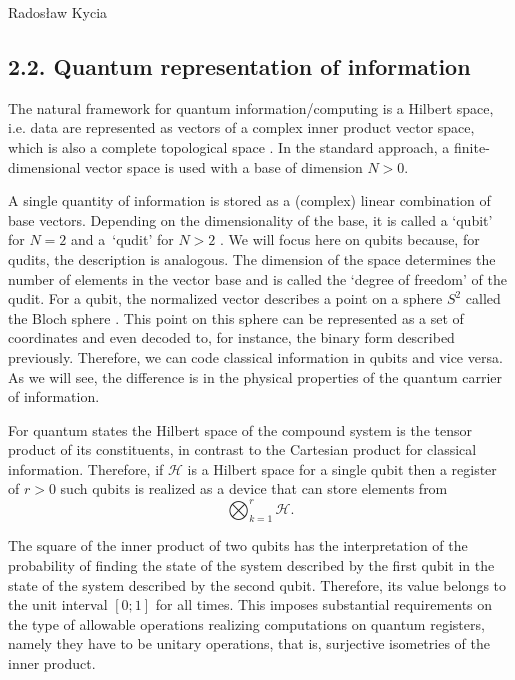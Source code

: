 \begin{artengenv}{Radosław Kycia}
\subsection{2.2. Quantum representation of information}

The natural framework for quantum information/computing is a Hilbert space, i.e. data are represented as vectors of a complex inner product vector space, which is also a complete topological space \parencite{FunctionalAnalysisReed}. In the standard approach, a finite-dimensional vector space is used with a base of dimension $N >0$.

A single quantity of information is stored as a (complex) linear combination of base vectors. Depending on the dimensionality of the base, it is called a `qubit' for $N=2$ and a~`qudit' for $N>2$ \parencite[see e.g.][]{QuantumComputing}. We will focus here on qubits because, for qudits, the description is analogous. The dimension of the space determines the number of elements in the vector base and is called the `degree of freedom' of the qudit. For a qubit, the normalized vector describes a point on a sphere $S^{2}$ called the Bloch sphere \parencite{QuantumComputing}. This point on this sphere can be represented as a set of coordinates and even decoded to, for instance, the binary form described previously. Therefore, we can code classical information in qubits and vice versa. As we will see, the difference is in the physical properties of the quantum carrier of information. 

For quantum states the Hilbert space of the compound system is the tensor product of its constituents, in contrast to the Cartesian product for classical information. Therefore, if $\mathcal{H}$ is a Hilbert space for a single qubit then a register of $r>0$ such qubits is realized as a device that can store elements from
\begin{equation}
 \bigotimes_{k=1}^{r} \mathcal{H}.
\end{equation}

The square of the inner product of two qubits has the interpretation of the probability of finding the state of the system described by the first qubit in the state of the system described by the second qubit. Therefore, its value belongs to the unit interval $[0; 1]$ for all times. This imposes substantial requirements on the type of allowable operations realizing computations on quantum registers, namely they have to be unitary operations, that is, surjective isometries of the inner product.


\end{artengenv}
